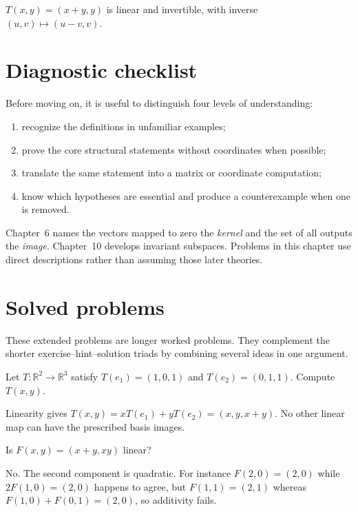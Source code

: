 \begin{example}[Shear]\label{ex:i05-worked-03}
$T(x,y)=(x+y,y)$ is linear and invertible, with inverse $(u,v)\mapsto(u-v,v)$.
\end{example}

\section{Diagnostic checklist}
Before moving on, it is useful to distinguish four levels of understanding:
\begin{enumerate}
\item recognize the definitions in unfamiliar examples;
\item prove the core structural statements without coordinates when possible;
\item translate the same statement into a matrix or coordinate computation;
\item know which hypotheses are essential and produce a counterexample when one is removed.
\end{enumerate}

\begin{remark}
Chapter~6 names the vectors mapped to zero the \emph{kernel} and the set of all
outputs the \emph{image}. Chapter~10 develops invariant subspaces. Problems in
this chapter use direct descriptions rather than assuming those later theories.
\end{remark}

\section{Solved problems}
These extended problems are longer worked problems. They complement the shorter exercise--hint--solution triads by combining several ideas in one argument.

\begin{problem}\label{prob:i05-problem-01}
Let $T:\mathbb R^2\to\mathbb R^3$ satisfy $T(e_1)=(1,0,1)$ and $T(e_2)=(0,1,1)$. Compute $T(x,y)$.
\end{problem}
\begin{solution}
Linearity gives $T(x,y)=xT(e_1)+yT(e_2)=(x,y,x+y)$. No other linear map can have the prescribed basis images.
\end{solution}

\begin{problem}\label{prob:i05-problem-02}
Is $F(x,y)=(x+y,xy)$ linear?
\end{problem}
\begin{solution}
No. The second component is quadratic. For instance $F(2,0)=(2,0)$ while $2F(1,0)=(2,0)$ happens to agree, but $F(1,1)=(2,1)$ whereas $F(1,0)+F(0,1)=(2,0)$, so additivity fails.
\end{solution}

